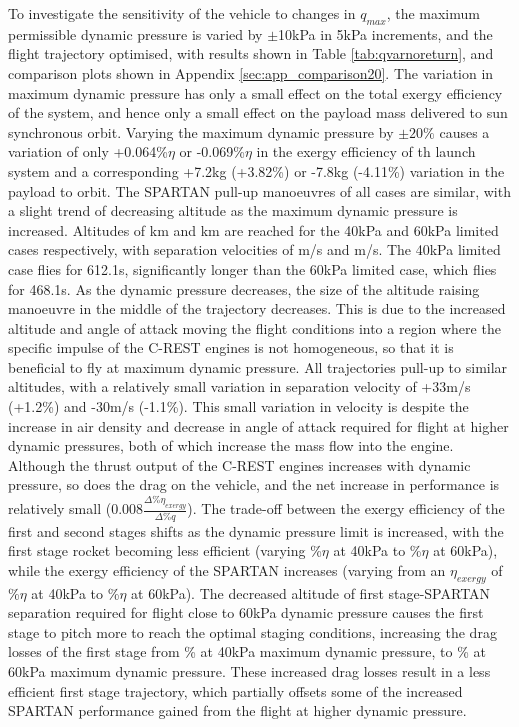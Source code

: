 To investigate the sensitivity of the vehicle to changes in $q_{max}$, the maximum permissible dynamic pressure is varied by $\pm$10kPa in 5kPa increments, and the flight trajectory optimised, with results shown in Table \ref{tab:qvarnoreturn}, and comparison plots shown in Appendix \ref{sec:app_comparison20}.
The variation in maximum dynamic pressure has only a small effect on the total exergy efficiency of the system, and hence only a small effect on the payload mass delivered to sun synchronous orbit.  Varying the maximum dynamic pressure by $\pm20\%$ causes a variation of only +0.064\%$\eta$ or -0.069\%$\eta$ in the exergy efficiency of th launch system and a corresponding +7.2kg (+3.82\%) or -7.8kg (-4.11\%) variation in the payload to orbit.  
The SPARTAN pull-up manoeuvres of all cases are similar, with a slight trend of decreasing altitude as the maximum dynamic pressure is increased. Altitudes of \secondthirdSeparationAltqFortyNoReturn km and \secondthirdSeparationAltqSixtyNoReturn km are reached for the 40kPa and 60kPa limited cases respectively, with separation velocities of \secondthirdSeparationvqFortyNoReturn m/s and \secondthirdSeparationvqSixtyNoReturn m/s. The 40kPa limited case flies for 612.1s, significantly longer than the 60kPa limited case, which flies for 468.1s.
As the dynamic pressure decreases, the size of the altitude raising manoeuvre in the middle of the trajectory decreases. This is due to the increased altitude and angle of attack moving the flight conditions into a region where the specific impulse of the C-REST engines is not homogeneous, so that it is beneficial to fly at maximum dynamic pressure.  
All trajectories pull-up to similar altitudes, with a relatively small variation in separation velocity of +33m/s (+1.2\%) and -30m/s (-1.1\%).
This small variation in velocity is despite the increase in air density and decrease in angle of attack required for flight at higher dynamic pressures, both of which increase the mass flow into the engine. Although the thrust output of the C-REST engines increases with dynamic pressure, so does the drag on the vehicle, and the net increase in performance is relatively small (0.008$ \frac{\Delta\%\eta_{exergy}}{\Delta\%q}$). 
The trade-off between the exergy efficiency of the first and second stages shifts as the dynamic pressure limit is increased, with the first stage rocket becoming less efficient (varying \firstExergyEffqFortyNoReturn\%$\eta$ at 40kPa to \firstExergyEffqSixtyNoReturn\%$\eta$ at 60kPa), while the exergy efficiency of the SPARTAN increases (varying from an $\eta_{exergy}$ of \secondExergyEffqFortyNoReturn\%$\eta$ at 40kPa to \secondExergyEffqSixtyNoReturn\%$\eta$ at 60kPa). The decreased altitude of first stage-SPARTAN separation required for flight close to 60kPa dynamic pressure causes the first stage to pitch more to reach the optimal staging conditions, increasing the drag losses of the first stage from  \WDoneqFortyNoReturn\% at 40kPa maximum dynamic pressure, to \WDoneqSixtyNoReturn\% at 60kPa maximum dynamic pressure. 
These increased drag losses result in a less efficient first stage trajectory, which partially offsets some of the increased SPARTAN performance gained from the flight at higher dynamic pressure. 



